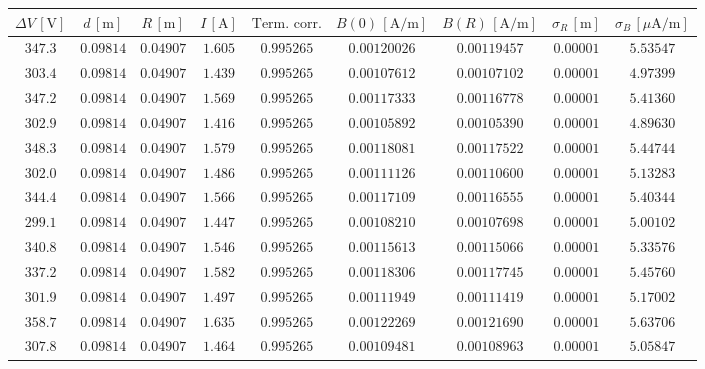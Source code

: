 \documentclass[]{article}
\begin{document}
\begin{table}
    \centering

\begin{tabular}{||c|c|c|c|c|c|c|c|c||}
    \hline
    $\Delta V\, [\text{V}] $ & $d\, [\text{m}] $ & $R\, [\text{m}] $ & $I\, [\text{A}] $ & $\text{Term. corr.}$ & $B(0)\, [\text{A/m}] $ & $B(R)\, [\text{A/m}] $ & $ \sigma_R \, [\text{m}] $ & $ \sigma_B \, [\mu\text{A/m}] $ \\
    \hline\hline



    $347.3$ & $0.09814$ & $0.04907$ & $1.605$ & $0.995265$ & $0.00120026$ & $0.00119457$ & $0.00001$ & $5.53547$ \\\hline
    $303.4$ & $0.09814$ & $0.04907$ & $1.439$ & $0.995265$ & $0.00107612$ & $0.00107102$ & $0.00001$ & $4.97399$ \\\hline
    $347.2$ & $0.09814$ & $0.04907$ & $1.569$ & $0.995265$ & $0.00117333$ & $0.00116778$ & $0.00001$ & $5.41360$ \\\hline
    $302.9$ & $0.09814$ & $0.04907$ & $1.416$ & $0.995265$ & $0.00105892$ & $0.00105390$ & $0.00001$ & $4.89630$ \\\hline
    $348.3$ & $0.09814$ & $0.04907$ & $1.579$ & $0.995265$ & $0.00118081$ & $0.00117522$ & $0.00001$ & $5.44744$ \\\hline
    $302.0$ & $0.09814$ & $0.04907$ & $1.486$ & $0.995265$ & $0.00111126$ & $0.00110600$ & $0.00001$ & $5.13283$ \\\hline
    $344.4$ & $0.09814$ & $0.04907$ & $1.566$ & $0.995265$ & $0.00117109$ & $0.00116555$ & $0.00001$ & $5.40344$ \\\hline
    $299.1$ & $0.09814$ & $0.04907$ & $1.447$ & $0.995265$ & $0.00108210$ & $0.00107698$ & $0.00001$ & $5.00102$ \\\hline
    $340.8$ & $0.09814$ & $0.04907$ & $1.546$ & $0.995265$ & $0.00115613$ & $0.00115066$ & $0.00001$ & $5.33576$ \\\hline
    $337.2$ & $0.09814$ & $0.04907$ & $1.582$ & $0.995265$ & $0.00118306$ & $0.00117745$ & $0.00001$ & $5.45760$ \\\hline
    $301.9$ & $0.09814$ & $0.04907$ & $1.497$ & $0.995265$ & $0.00111949$ & $0.00111419$ & $0.00001$ & $5.17002$ \\\hline
    $358.7$ & $0.09814$ & $0.04907$ & $1.635$ & $0.995265$ & $0.00122269$ & $0.00121690$ & $0.00001$ & $5.63706$ \\\hline
    $307.8$ & $0.09814$ & $0.04907$ & $1.464$ & $0.995265$ & $0.00109481$ & $0.00108963$ & $0.00001$ & $5.05847$ \\\hline

\end{tabular}
\end{table}
\end{document}
